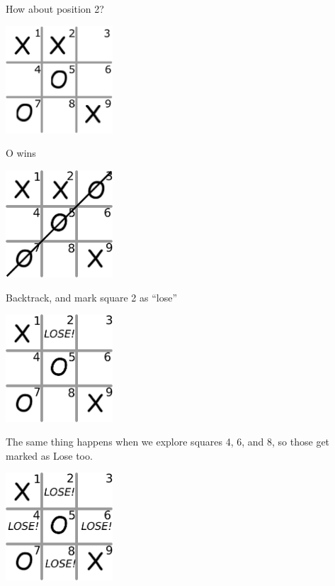 \documentclass{beamer} %
\begin{document}
\begin{frame}
  How about position 2?
  \begin{center}
\includegraphics[width=0.3\textwidth]{assets/oxo-board3b.pdf}
\end{center}
\end{frame}

\begin{frame}
  O wins
\begin{center}
\includegraphics[width=0.3\textwidth]{assets/oxo-board4.pdf}
\end{center}
\end{frame}

\begin{frame}
  Backtrack, and mark square 2 as ``lose''
\begin{center}
\includegraphics[width=0.3\textwidth]{assets/oxo-board5.pdf}
\end{center}
\end{frame}

\begin{frame}
  The same thing happens when we explore squares 4, 6, and 8, so those get marked as Lose too.
  \begin{center}
\includegraphics[width=0.3\textwidth]{assets/oxo-board6.pdf}
\end{center}
\end{frame}
\end{document}
